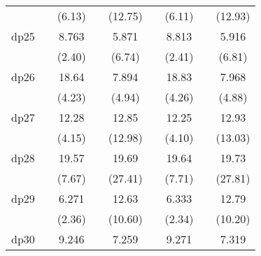 {\begin{tabular}{l*{8}{c}}
            &                     &      (6.13)         &                     &     (12.75)         &                     &      (6.11)         &                     &     (12.93)         \\
[1em]
dp25        &                     &       8.763\sym{*}  &                     &       5.871\sym{***}&                     &       8.813\sym{*}  &                     &       5.916\sym{***}\\
            &                     &      (2.40)         &                     &      (6.74)         &                     &      (2.41)         &                     &      (6.81)         \\
[1em]
dp26        &                     &       18.64\sym{***}&                     &       7.894\sym{***}&                     &       18.83\sym{***}&                     &       7.968\sym{***}\\
            &                     &      (4.23)         &                     &      (4.94)         &                     &      (4.26)         &                     &      (4.88)         \\
[1em]
dp27        &                     &       12.28\sym{***}&                     &       12.85\sym{***}&                     &       12.25\sym{***}&                     &       12.93\sym{***}\\
            &                     &      (4.15)         &                     &     (12.98)         &                     &      (4.10)         &                     &     (13.03)         \\
[1em]
dp28        &                     &       19.57\sym{***}&                     &       19.69\sym{***}&                     &       19.64\sym{***}&                     &       19.73\sym{***}\\
            &                     &      (7.67)         &                     &     (27.41)         &                     &      (7.71)         &                     &     (27.81)         \\
[1em]
dp29        &                     &       6.271\sym{*}  &                     &       12.63\sym{***}&                     &       6.333\sym{*}  &                     &       12.79\sym{***}\\
            &                     &      (2.36)         &                     &     (10.60)         &                     &      (2.34)         &                     &     (10.20)         \\
[1em]
dp30        &                     &       9.246\sym{***}&                     &       7.259\sym{***}&                     &       9.271\sym{***}&                     &       7.319\sym{***}\\

\end{tabular}}

